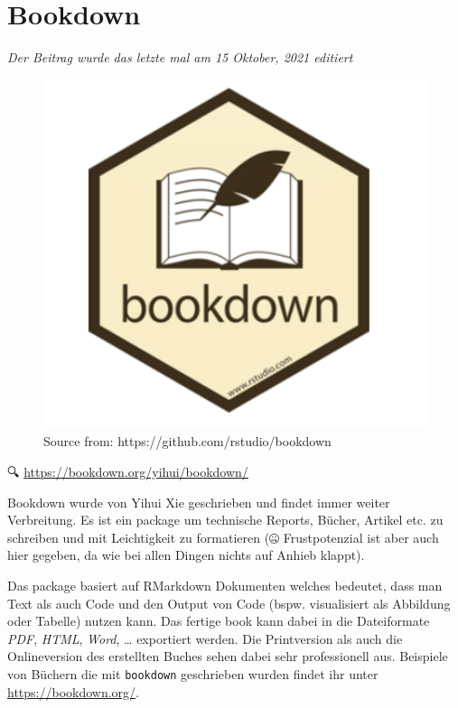 \documentclass[
]{article}
\begin{document}
\hypertarget{bookdown}{%
\section{Bookdown}\label{bookdown}}

\emph{Der Beitrag wurde das letzte mal am 15 Oktober, 2021 editiert}

\begin{figure}

{\centering \includegraphics[width=1\linewidth]{images/065} 

}

\caption{Source from: https://github.com/rstudio/bookdown}\label{fig:unnamed-chunk-306}
\end{figure}

🔍 \url{https://bookdown.org/yihui/bookdown/}

Bookdown wurde von Yihui Xie geschrieben und findet immer weiter Verbreitung. Es ist ein package um technische Reports, Bücher, Artikel etc. zu schreiben und mit Leichtigkeit zu formatieren (🤐 Frustpotenzial ist aber auch hier gegeben, da wie bei allen Dingen nichts auf Anhieb klappt).

Das package basiert auf RMarkdown Dokumenten welches bedeutet, dass man Text als auch Code und den Output von Code (bspw. visualisiert als Abbildung oder Tabelle) nutzen kann. Das fertige book kann dabei in die Dateiformate \emph{PDF}, \emph{HTML}, \emph{Word}, \ldots{} exportiert werden. Die Printversion als auch die Onlineversion des erstellten Buches sehen dabei sehr professionell aus. Beispiele von Büchern die mit \texttt{bookdown} geschrieben wurden findet ihr unter \url{https://bookdown.org/}.
\end{document}
